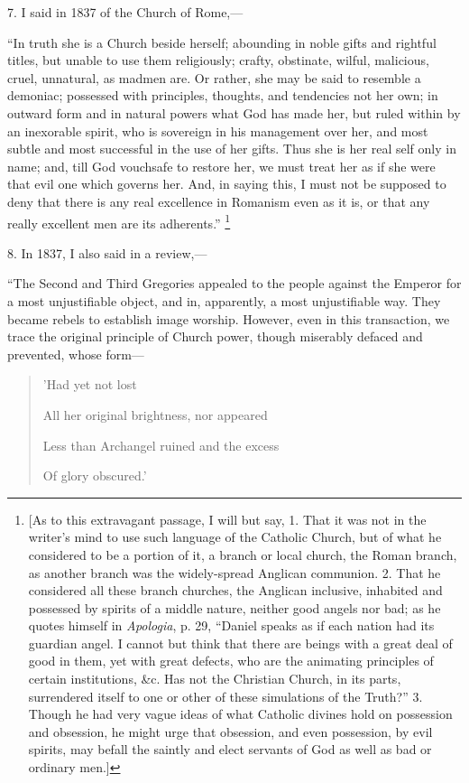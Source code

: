 7. I said in 1837 of the Church of Rome,—

``In truth she is a Church beside herself;
abounding in noble gifts and rightful titles, but unable to use them
religiously; crafty, obstinate, wilful, malicious, cruel, unnatural,
as madmen are. Or rather, she may be said to resemble a demoniac;
possessed with principles, thoughts, and tendencies not her own; in
outward form and in natural powers what God has made her, but ruled
within by an inexorable spirit, who is sovereign in his management
over her, and most subtle and most successful in the use of her gifts.
Thus she is her real self only in name; and, till God vouchsafe to
restore her, we must treat her as if she were that evil one which
governs her. And, in saying this, I must not be supposed to deny that
there is any real excellence in Romanism even as it is, or that any
really excellent men are its adherents.'' \footnote{[As to this extravagant passage, I will but
say, 1. That it was not in the writer's mind to use such language of
the Catholic Church, but of what he considered to be a portion of it,
a branch or local church, the Roman branch, as another branch was the
widely-spread Anglican communion. 2. That he considered all these
branch churches, the Anglican inclusive, inhabited and possessed by
spirits of a middle nature, neither good angels nor bad; as he quotes
himself in \emph{Apologia}, p. 29, ``Daniel speaks as if each
nation had its guardian angel. I cannot but think that there are
beings with a great deal of good in them, yet with great defects, who
are the animating principles of certain institutions, \&c. Has not
the Christian Church, in its parts, surrendered itself to one or other
of these simulations of the Truth?'' 3. Though he had very vague
ideas of what Catholic divines hold on possession and obsession, he
might urge that obsession, and even possession, by evil spirits, may
befall the saintly and elect servants of God as well as bad or
ordinary men.]}

8. In 1837, I also said in a review,—

``The Second and Third Gregories appealed to the
people against the Emperor for a most unjustifiable object, and in,
apparently, a most unjustifiable way. They became rebels to establish
image worship. However, even in this transaction, we trace the
original principle of Church power, though miserably defaced and
prevented, whose form—

\begin{quote}

'Had yet not lost

All her original brightness, nor appeared

Less than Archangel ruined and the excess

Of glory obscured.'

\end{quote}

